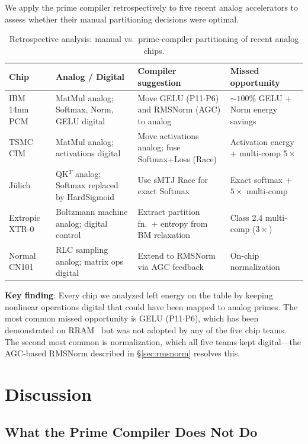 \documentclass[11pt]{article}
\begin{document}
We apply the prime compiler retrospectively to five recent analog accelerators to assess whether their manual partitioning decisions were optimal.

\begin{table}[t]
\centering
\caption{Retrospective analysis: manual vs.\ prime-compiler partitioning of recent analog chips.}
\label{tab:chips}
\footnotesize
\begin{tabular}{p{2.8cm}p{2.5cm}p{2.5cm}p{4.5cm}}
\toprule
Chip & Analog / Digital & Compiler suggestion & Missed opportunity \\
\midrule
IBM 14nm PCM~\cite{ibm2025} & MatMul analog; Softmax, Norm, GELU digital & Move GELU (P11$\cdot$P6) and RMSNorm (AGC) to analog & ${\sim}100\%$ GELU + Norm energy savings \\
\midrule
TSMC CIM~\cite{tsmc2025} & MatMul analog; activations digital & Move activations analog; fuse Softmax+Loss (Race) & Activation energy + multi-comp $5\times$ \\
\midrule
J\"ulich~\cite{leroux2025a} & QK$^T$ analog; Softmax replaced by HardSigmoid & Use sMTJ Race for exact Softmax & Exact softmax + $5\times$ multi-comp \\
\midrule
Extropic XTR-0~\cite{extropic2025} & Boltzmann machine analog; digital control & Extract partition fn.\ + entropy from BM relaxation & Class 2.4 multi-comp ($3\times$) \\
\midrule
Normal CN101~\cite{normal2025} & RLC sampling analog; matrix ops digital & Extend to RMSNorm via AGC feedback & On-chip normalization \\
\bottomrule
\end{tabular}
\end{table}

\textbf{Key finding}: Every chip we analyzed left energy on the table by keeping nonlinear operations digital that could have been mapped to analog primes. The most common missed opportunity is GELU (P11$\cdot$P6), which has been demonstrated on RRAM~\cite{rram_swish2022,raceit2023} but was not adopted by any of the five chip teams. The second most common is normalization, which all five teams kept digital---the AGC-based RMSNorm described in \S\ref{sec:rmsnorm} resolves this.

\section{Discussion}

\subsection{What the Prime Compiler Does Not Do}
\end{document}
